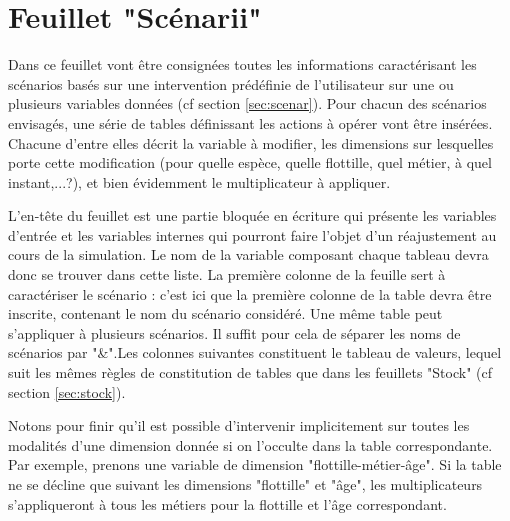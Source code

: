 \documentclass[12pt, colorinlistoftodos, notitlepage]{report}
\newenvironment{not used}[1]{%
    \longtable{%
        |>{\centering$\displaystyle}A{#1}{1}<{$}%
        |}\hline\ignorespaces}{%
    \endlongtable\ignorespacesafterend}
\begin{document}
\section{Feuillet "Scénarii"}

Dans ce feuillet vont être consignées toutes les informations caractérisant les scénarios basés sur une intervention prédéfinie de l'utilisateur sur une ou plusieurs variables données (cf section \ref{sec:scenar}). Pour chacun des scénarios envisagés, une série de tables définissant les actions à opérer vont être insérées. Chacune d'entre elles décrit la variable à modifier, les dimensions sur lesquelles porte cette modification (pour quelle espèce, quelle flottille, quel métier, à quel instant,...?), et bien évidemment le multiplicateur à appliquer.

L'en-tête du feuillet est une partie bloquée en écriture qui présente les variables d'entrée et les variables internes qui pourront faire l'objet d'un réajustement au cours de la simulation. Le nom de la variable composant chaque tableau devra donc se trouver dans cette liste. La première colonne de la feuille sert à caractériser le scénario : c'est ici que la première colonne de la table devra être inscrite, contenant le nom du scénario considéré. Une même table peut s'appliquer à plusieurs scénarios. Il suffit pour cela de séparer les noms de scénarios par "\&".Les colonnes suivantes constituent le tableau de valeurs, lequel suit les mêmes règles de constitution de tables que dans les feuillets "Stock" (cf section \ref{sec:stock}).

Notons pour finir qu'il est possible d'intervenir implicitement sur toutes les modalités d'une dimension donnée si on l'occulte dans la table correspondante. Par exemple, prenons une variable de dimension "flottille-métier-âge". Si la table ne se décline que suivant les dimensions "flottille" et "âge", les multiplicateurs s'appliqueront à tous les métiers pour la flottille et l'âge correspondant.
\end{document}

